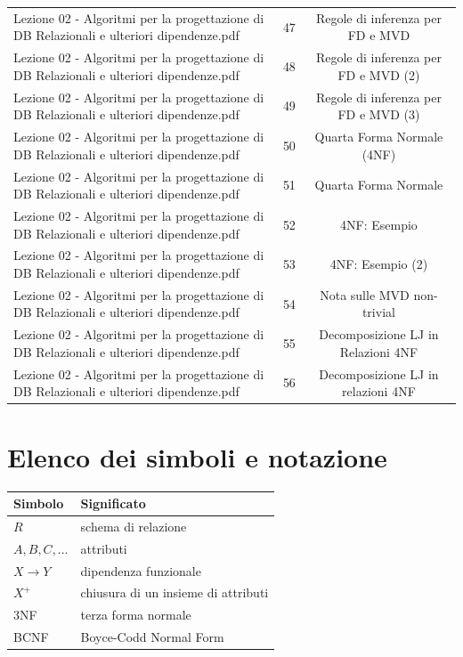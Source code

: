 \documentclass[11pt]{article}
\begin{document}
\begin{longtable}{@{}p{}cc@{}}
Lezione 02 - Algoritmi per la progettazione di DB Relazionali e ulteriori dipendenze.pdf & 47 & Regole di inferenza per FD e MVD \\
Lezione 02 - Algoritmi per la progettazione di DB Relazionali e ulteriori dipendenze.pdf & 48 & Regole di inferenza per FD e MVD (2) \\
Lezione 02 - Algoritmi per la progettazione di DB Relazionali e ulteriori dipendenze.pdf & 49 & Regole di inferenza per FD e MVD (3) \\
Lezione 02 - Algoritmi per la progettazione di DB Relazionali e ulteriori dipendenze.pdf & 50 & Quarta Forma Normale (4NF) \\
Lezione 02 - Algoritmi per la progettazione di DB Relazionali e ulteriori dipendenze.pdf & 51 & Quarta Forma Normale \\
Lezione 02 - Algoritmi per la progettazione di DB Relazionali e ulteriori dipendenze.pdf & 52 & 4NF: Esempio \\
Lezione 02 - Algoritmi per la progettazione di DB Relazionali e ulteriori dipendenze.pdf & 53 & 4NF: Esempio (2) \\
Lezione 02 - Algoritmi per la progettazione di DB Relazionali e ulteriori dipendenze.pdf & 54 & Nota sulle MVD non-trivial \\
Lezione 02 - Algoritmi per la progettazione di DB Relazionali e ulteriori dipendenze.pdf & 55 & Decomposizione LJ in Relazioni 4NF \\
Lezione 02 - Algoritmi per la progettazione di DB Relazionali e ulteriori dipendenze.pdf & 56 & Decomposizione LJ in relazioni 4NF \\
\bottomrule
\end{longtable}
\section{Elenco dei simboli e notazione}
\begin{tabular}{@{}ll@{}}
\toprule
Simbolo & Significato \\
\midrule
$R$ & schema di relazione \\
$A,B,C,\dots$ & attributi \\
$X \to Y$ & dipendenza funzionale \\
$X^+$ & chiusura di un insieme di attributi \\
3NF & terza forma normale \\
BCNF & Boyce-Codd Normal Form \\
\bottomrule
\end{tabular}
\end{document}
